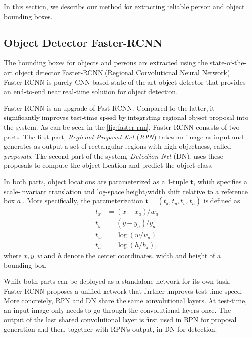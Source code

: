 In this section, we describe our method for extracting reliable person and object bounding boxes.

\subsection{Object Detector Faster-RCNN}
The bounding boxes for objects and persons are extracted using the state-of-the-art object detector Faster-RCNN (Regional Convolutional Neural Network)\cite{ren2015faster}. 
Faster-RCNN is purely CNN-based state-of-the-art object detector that provides an end-to-end near real-time solution for object detection.

Faster-RCNN is an upgrade of Fast-RCNN. Compared to the latter, it significantly improves test-time speed by integrating regional object proposal into the system. As can be seen in the \autoref{fig:faster-rnn}, Faster-RCNN consists of two parts. The first part, \textit{Regional Proposal Net} (\textit{RPN}) takes an image as input and generates as output a set of rectangular regions with high objectness, called \textit{proposals}. 
The second part of the system, \textit{Detection Net} (DN), uses these proposals to compute the object location and predict the object class.

In both parts, object locations are parameterized as a 4-tuple  $ \mathbf{t} $, which specifies a scale-invariant translation and log-space height/width shift relative to a reference box $ a $ \cite{girshick2014rich}.
More specifically, the parameterization $ \mathbf{t} = \left(t_{x}, t_{y}, t_{w}, t_{h}\right) $ is defined as
\begin{equation}
\begin{aligned}\label{eq:bbtuple}
t_{x} &= (x-x_{a})/w_{a}\\
t_{y} &= (y-y_{a})/y_{a}\\
t_{w} &= \log(w/w_{a})\\
t_{h} &= \log(h/h_{a}),
\end{aligned}
\end{equation}
where $ x, y, w$ and $ h $ denote the center coordinates, width and height of a bounding box.

While both parts can be deployed as a standalone network for its own task, Faster-RCNN proposes a unified network that further improves test-time speed. 
More concretely, RPN and DN share the same convolutional layers. 
At test-time, an input image only needs to go through the convolutional layers once.
The output of the last shared convolutional layer is first used in RPN for proposal generation and then, together with RPN's output, in DN for detection.


